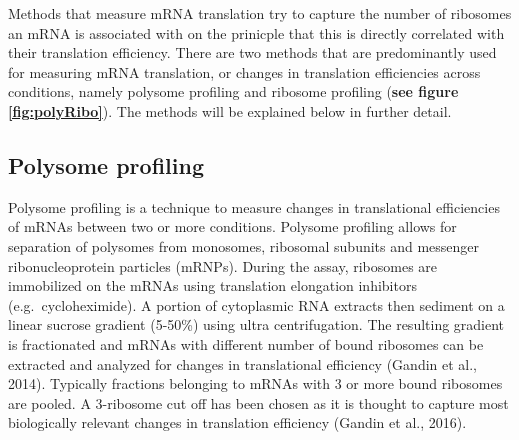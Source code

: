 \documentclass[
  12pt,
  openany]{book}
\begin{document}
Methods that measure mRNA translation try to capture the number of ribosomes an mRNA is associated with on the prinicple that this is directly correlated with their translation efficiency. There are two methods that are predominantly used for measuring mRNA translation, or changes in translation efficiencies across conditions, namely polysome profiling and ribosome profiling (\textbf{see figure \ref{fig:polyRibo}}). The methods will be explained below in further detail.

\subsection{Polysome profiling}

Polysome profiling is a technique to measure changes in translational efficiencies of mRNAs between two or more conditions. Polysome profiling allows for separation of polysomes from monosomes, ribosomal subunits and messenger ribonucleoprotein particles (mRNPs). During the assay, ribosomes are immobilized on the mRNAs using translation elongation inhibitors (e.g.~cycloheximide). A portion of cytoplasmic RNA extracts then sediment on a linear sucrose gradient (5-50\%) using ultra centrifugation. The resulting gradient is fractionated and mRNAs with different number of bound ribosomes can be extracted and analyzed for changes in translational efficiency (Gandin et al., 2014). Typically fractions belonging to mRNAs with 3 or more bound ribosomes are pooled. A 3-ribosome cut off has been chosen as it is thought to capture most biologically relevant changes in translation efficiency (Gandin et al., 2016).
\end{document}
